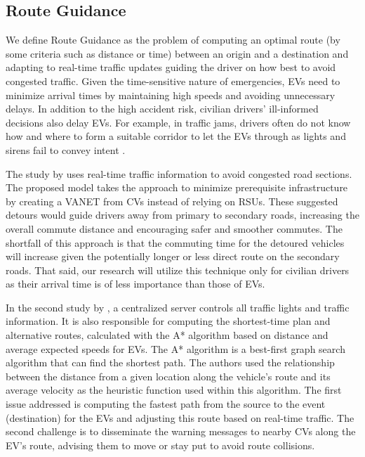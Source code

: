 \subsection{Route Guidance}
We define \gls{Route Guidance} as the problem of computing an optimal route (by some criteria such as distance or time) between an origin and a destination and adapting to real-time traffic updates guiding the driver on how best to avoid congested traffic. Given the time-sensitive nature of emergencies, EVs need to minimize arrival times by maintaining high speeds and avoiding unnecessary delays. In addition to the high accident risk, civilian drivers' ill-informed decisions also delay EVs. For example, in traffic jams, drivers often do not know how and where to form a suitable corridor to let the EVs through as lights and sirens fail to convey intent \cite{Buchenscheit2009}.

The study by \cite{Rizvi2007} uses real-time traffic information to avoid congested road sections. The proposed model takes the approach to minimize prerequisite infrastructure by creating a \acrshort{VANET} from CVs instead of relying on RSUs. These suggested detours would guide drivers away from primary to secondary roads, increasing the overall commute distance and encouraging safer and smoother commutes. The shortfall of this approach is that the commuting time for the detoured vehicles will increase given the potentially longer or less direct route on the secondary roads. That said, our research will utilize this technique only for civilian drivers as their arrival time is of less importance than those of EVs.

In the second study by \cite{Huang2009}, a centralized server controls all traffic lights and traffic information. It is also responsible for computing the shortest-time plan and alternative routes, calculated with the \gls{A* algorithm} based on distance and average expected speeds for EVs. The \gls{A* algorithm} is a best-first graph search algorithm that can find the shortest path. The authors used the relationship between the distance from a given location along the vehicle's route and its average velocity as the heuristic function used within this algorithm. The first issue addressed is computing the fastest path from the source to the event (destination) for the EVs and adjusting this route based on real-time traffic. The second challenge is to disseminate the warning messages to nearby CVs along the EV's route, advising them to move or stay put to avoid route collisions.

